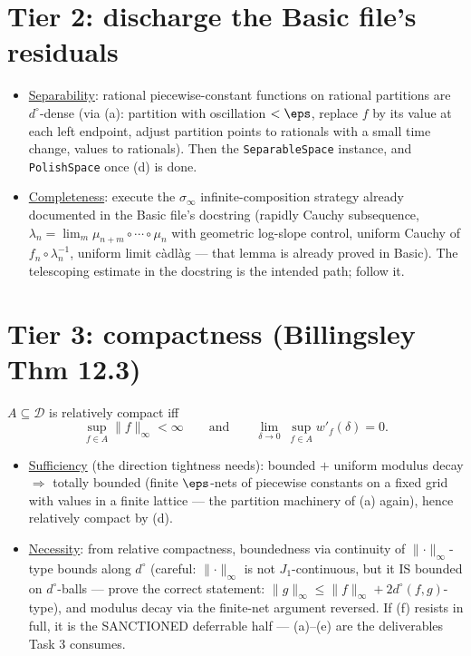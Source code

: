 \documentclass[11pt]{article}
\theoremstyle{plain}
\theoremstyle{remark}
\newcommand{\D}{\mathcal D}\newcommand{\norm}[1]{\lVert #1\rVert}
\begin{document}
\section*{Tier 2: discharge the Basic file's residuals}

\begin{itemize}
\item[(c)] \underline{Separability}: rational piecewise-constant functions on
rational partitions are $d^\circ$-dense (via (a): partition with oscillation
$<\eps$, replace $f$ by its value at each left endpoint, adjust partition
points to rationals with a small time change, values to rationals). Then the
\texttt{SeparableSpace} instance, and \texttt{PolishSpace} once (d) is done.
\item[(d)] \underline{Completeness}: execute the $\sigma_\infty$
infinite-composition strategy already documented in the Basic file's
docstring (rapidly Cauchy subsequence, $\lambda_n=\lim_m\mu_{n+m}\circ\cdots
\circ\mu_n$ with geometric log-slope control, uniform Cauchy of
$f_n\circ\lambda_n^{-1}$, uniform limit c\`adl\`ag --- that lemma is already
proved in Basic). The telescoping estimate in the docstring is the intended
path; follow it.
\end{itemize}

\section*{Tier 3: compactness (Billingsley Thm 12.3)}

$A\subseteq\D$ is relatively compact iff
\[
  \sup_{f\in A}\norm f_\infty<\infty
  \qquad\text{and}\qquad
  \lim_{\delta\to0}\ \sup_{f\in A}w'_f(\delta)=0 .
\]
\begin{itemize}
\item[(e)] \underline{Sufficiency} (the direction tightness needs): bounded
$+$ uniform modulus decay $\Rightarrow$ totally bounded (finite $\eps$-nets of
piecewise constants on a fixed grid with values in a finite lattice --- the
partition machinery of (a) again), hence relatively compact by (d).
\item[(f)] \underline{Necessity}: from relative compactness, boundedness via
continuity of $\norm\cdot_\infty$-type bounds along $d^\circ$ (careful:
$\norm\cdot_\infty$ is not $J_1$-continuous, but it IS bounded on
$d^\circ$-balls --- prove the correct statement:
$\norm g_\infty\le\norm f_\infty+2d^\circ(f,g)$-type), and modulus decay via
the finite-net argument reversed. If (f) resists in full, it is the
SANCTIONED deferrable half --- (a)--(e) are the deliverables Task 3 consumes.
\end{itemize}
\end{document}
